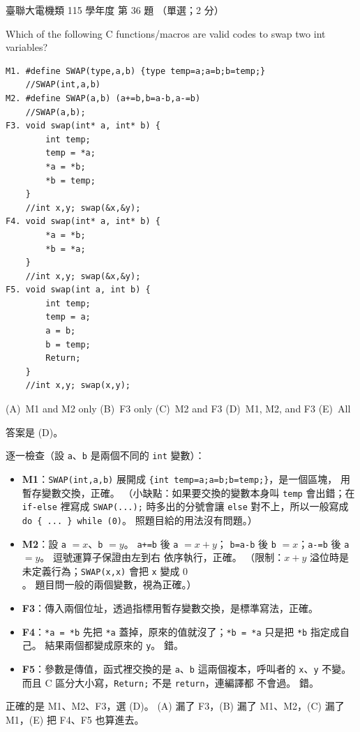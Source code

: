 \begin{pastexam}[label={px:ust-115-ee-ds-36}]{臺聯大電機類 115 學年度 第 36 題}
（單選；2 分）

Which of the following C functions/macros are valid codes to swap two int variables?
\begin{verbatim}
M1. #define SWAP(type,a,b) {type temp=a;a=b;b=temp;}
    //SWAP(int,a,b)
M2. #define SWAP(a,b) (a+=b,b=a-b,a-=b)
    //SWAP(a,b);
F3. void swap(int* a, int* b) {
        int temp;
        temp = *a;
        *a = *b;
        *b = temp;
    }
    //int x,y; swap(&x,&y);
F4. void swap(int* a, int* b) {
        *a = *b;
        *b = *a;
    }
    //int x,y; swap(&x,&y);
F5. void swap(int a, int b) {
        int temp;
        temp = a;
        a = b;
        b = temp;
        Return;
    }
    //int x,y; swap(x,y);
\end{verbatim}

(A)~M1 and M2 only \qquad (B)~F3 only \qquad (C)~M2 and F3 \qquad (D)~M1, M2, and F3 \qquad (E)~All
\end{pastexam}

\begin{pastsoln}
答案是 (D)。

逐一檢查（設 \texttt{a}、\texttt{b} 是兩個不同的 \texttt{int} 變數）：
\begin{itemize}
\item \textbf{M1}：\texttt{SWAP(int,a,b)} 展開成 \texttt{\{int temp=a;a=b;b=temp;\}}，是一個區塊，
用暫存變數交換，正確。 （小缺點：如果要交換的變數本身叫 \texttt{temp} 會出錯；在 \texttt{if-else}
裡寫成 \texttt{SWAP(...);} 時多出的分號會讓 \texttt{else} 對不上，所以一般寫成
\texttt{do \{ ... \} while (0)}。 照題目給的用法沒有問題。）
\item \textbf{M2}：設 \texttt{a} $= x$、\texttt{b} $= y$。 \texttt{a+=b} 後 \texttt{a} $= x + y$；
\texttt{b=a-b} 後 \texttt{b} $= x$；\texttt{a-=b} 後 \texttt{a} $= y$。 逗號運算子保證由左到右
依序執行，正確。 （限制：$x + y$ 溢位時是未定義行為；\texttt{SWAP(x,x)} 會把 \texttt{x} 變成 $0$。
題目問一般的兩個變數，視為正確。）
\item \textbf{F3}：傳入兩個位址，透過指標用暫存變數交換，是標準寫法，正確。
\item \textbf{F4}：\texttt{*a = *b} 先把 \texttt{*a} 蓋掉，原來的值就沒了；\texttt{*b = *a} 只是把
\texttt{*b} 指定成自己。 結果兩個都變成原來的 \texttt{y}。 錯。
\item \textbf{F5}：參數是傳值，函式裡交換的是 \texttt{a}、\texttt{b} 這兩個複本，呼叫者的
\texttt{x}、\texttt{y} 不變。 而且 C 區分大小寫，\texttt{Return;} 不是 \texttt{return}，連編譯都
不會過。 錯。
\end{itemize}
正確的是 M1、M2、F3，選 (D)。 (A) 漏了 F3，(B) 漏了 M1、M2，(C) 漏了 M1，(E) 把 F4、F5 也算進去。
\end{pastsoln}
